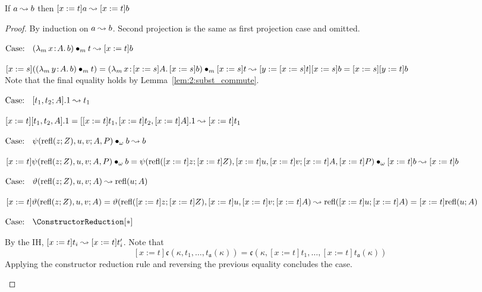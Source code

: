 \begin{lemma}
    If $a \leadsto b$ then $[x := t]a \leadsto [x := t]b$
    \label{lem:2:betared_subst}
\end{lemma}
\begin{proof}
    By induction on $a \leadsto b$.
    Second projection is the same as first projection case and omitted.

    $\text{Case: }\begin{array}{c} ({\lambda_m}\, x\! : \! A.\, b) \bullet_{m} t \leadsto [x := t]b \end{array}$
    \begin{proofcase}
        $[x := s](({\lambda_m}\, y\! : \! A.\, b) \bullet_{m} t) = ({\lambda_m}\, x\! : \! [x := s]A.\, [x := s]b) \bullet_{m} [x := s]t \leadsto [y := [x := s]t][x := s]b = [x := s][y := t]b$ \\
        Note that the final equality holds by Lemma~\ref{lem:2:subst_commute}.
    \end{proofcase}

    $\text{Case: }\begin{array}{c} [t_1, t_2; A].1 \leadsto t_1 \end{array}$
    \begin{proofcase}
        $[x := t][t_1, t_2, A].1 = [[x := t]t_1, [x := t]t_2, [x := t]A].1 \leadsto [x := t]t_1$
    \end{proofcase}

    $\text{Case: }\begin{array}{c} \psi(\text{refl}(z; Z), u, v; A, P) \bullet_{\omega} b \leadsto b \end{array}$
    \begin{proofcase}
        $[x := t]\psi(\text{refl}(z; Z), u, v; A, P) \bullet_{\omega} b = \psi(\text{refl}([x := t]z; [x := t]Z), [x := t]u, [x := t]v; [x := t]A, [x := t]P) \bullet_{\omega} [x := t]b \leadsto [x := t]b$
    \end{proofcase}

    $\text{Case: }\begin{array}{c} \vartheta(\text{refl}(z; Z), u, v; A) \leadsto \text{refl}(u; A) \end{array}$
    \begin{proofcase}
        $[x := t]\vartheta(\text{refl}(z; Z), u, v; A) = \vartheta(\text{refl}([x := t]z; [x := t]Z), [x := t]u, [x := t]v; [x := t]A) \leadsto \text{refl}([x := t]u; [x := t]A) = [x := t]\text{refl}(u; A)$
    \end{proofcase}

    $\text{Case: }\begin{array}{c} \ConstructorReduction[*] \end{array}$
    \begin{proofcase}
        By the IH, $[x := t]t_i \leadsto [x := t]t_i^\prime$.
        Note that $$[x := t]\mathfrak{c}(\kappa, t_1, \ldots, t_{\mathfrak{a}}(\kappa)) = \mathfrak{c}(\kappa, [x := t]t_1, \ldots, [x := t]t_{\mathfrak{a}}(\kappa))$$
        Applying the constructor reduction rule and reversing the previous equality concludes the case.
    \end{proofcase}


\end{proof}
